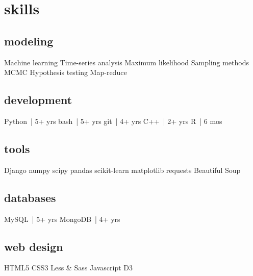 \section{skills}
\subsection{modeling}
Machine learning
Time-series analysis
Maximum likelihood
Sampling methods
MCMC
Hypothesis testing
Map-reduce
~
\subsection{development}
Python~| 5+ yrs
bash~| 5+ yrs
git~| 4+ yrs
C++~| 2+ yrs
R~| 6 mos
~
\subsection{tools}
Django
numpy
scipy
pandas
scikit-learn
matplotlib
requests
Beautiful Soup
~
\subsection{databases}
MySQL~| 5+ yrs
MongoDB~| 4+ yrs
~
\subsection{web design}
HTML5
CSS3
Less \& Sass
Javascript
D3%
